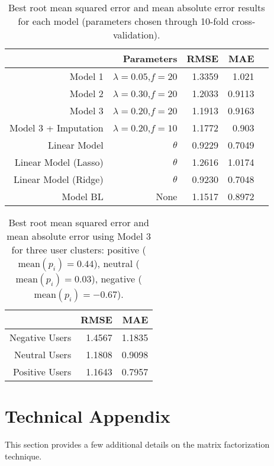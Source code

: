 \documentclass[12pt]{article}
\begin{document}
\begin{table}[htbp]
  \centering
  \caption{Best root mean squared error and mean absolute error results for each model (parameters chosen through 10-fold cross-validation).}
    \begin{tabular}{rrrrr}
    \toprule
          & Parameters & RMSE  & MAE \\
    \midrule
    Model 1 & $\lambda=0.05$,$f=20$ & 1.3359 & 1.021 \\
    Model 2 & $\lambda=0.30$,$f=20$ & 1.2033 & 0.9113 \\
    Model 3 & $\lambda=0.20$,$f=20$ & 1.1913 & 0.9163 \\
    Model 3 + Imputation & $\lambda=0.20$,$f=10$ & 1.1772 & 0.903 \\
    Linear Model & $\theta$ & 0.9229 & 0.7049 \\
    Linear Model (Lasso) & $\theta$ & 1.2616 & 1.0174 \\
    Linear Model (Ridge) & $\theta$ & 0.9230 & 0.7048 \\
    Model BL & None & 1.1517 & 0.8972 \\
    \bottomrule
    \end{tabular}%
  \label{tab:results}%
\end{table}%

\begin{table}[htbp]
  \centering
  \caption{Best root mean squared error and mean absolute error using Model 3 for three user clusters: positive ($\text{mean}(p_i)=0.44$), neutral ($\text{mean}(p_i)=0.03$), negative ($\text{mean}(p_i)=-0.67$).}
    \begin{tabular}{rrr}
    \toprule
          & RMSE  & MAE \\
    \midrule
    Negative Users & 1.4567 & 1.1835 \\
    Neutral Users & 1.1808 & 0.9098 \\
    Positive Users & 1.1643 & 0.7957 \\
    \bottomrule
    \end{tabular}%
  \label{tab:results_clusters}%
\end{table}%



\newpage
\section{Technical Appendix}
This section provides a few additional details on the matrix factorization technique. 
\end{document}
